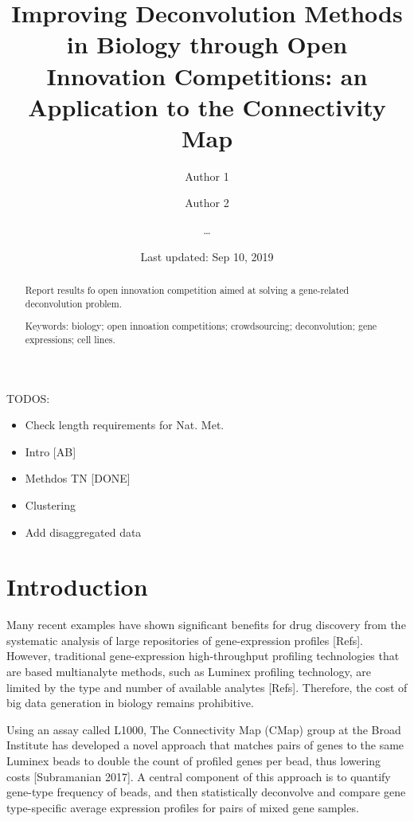 \documentclass[]{article}
\title{Improving Deconvolution Methods in Biology through Open Innovation
Competitions: an Application to the Connectivity Map}
\author{Author 1 \and Author 2 \and \ldots{}}
\date{Last updated: Sep 10, 2019}
\providecommand{\tightlist}{%
  \setlength{\itemsep}{0pt}\setlength{\parskip}{0pt}}
\begin{document}
\maketitle
\begin{abstract}
Report results fo open innovation competition aimed at solving a
gene-related deconvolution problem.


\smallskip\noindent 
Keywords: biology; open innoation competitions; crowdsourcing; deconvolution; gene expressions; cell lines.
\end{abstract}

{
\setcounter{tocdepth}{2}
\newpage
\tableofcontents
\newpage
}
\color{red}

TODOS:

\begin{itemize}
\tightlist
\item
  Check length requirements for Nat. Met.
\item
  Intro {[}AB{]}
\item
  Methdos TN {[}DONE{]}
\item
  Clustering
\item
  Add disaggregated data
\end{itemize}

\color{black}

\hypertarget{introduction}{%
\section{Introduction}\label{introduction}}

Many recent examples have shown significant benefits for drug discovery
from the systematic analysis of large repositories of gene-expression
profiles {[}Refs{]}. However, traditional gene-expression
high-throughput profiling technologies that are based multianalyte
methods, such as Luminex profiling technology, are limited by the type
and number of available analytes {[}Refs{]}. Therefore, the cost of big
data generation in biology remains prohibitive.

Using an assay called L1000, The Connectivity Map (CMap) group at the
Broad Institute has developed a novel approach that matches pairs of
genes to the same Luminex beads to double the count of profiled genes
per bead, thus lowering costs {[}Subramanian 2017{]}. A central
component of this approach is to quantify gene-type frequency of beads,
and then statistically deconvolve and compare gene type-specific average
expression profiles for pairs of mixed gene samples.
\end{document}

